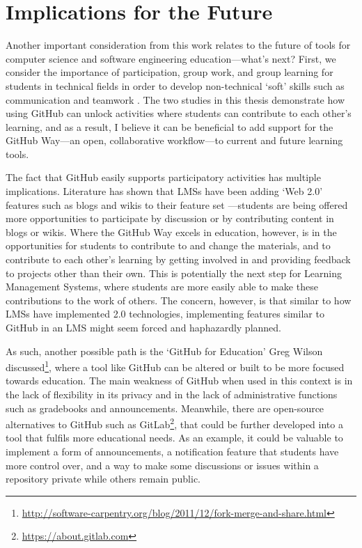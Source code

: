 \section{Implications for the Future}
Another important consideration from this work relates to the future of tools for computer science and software engineering education---what's next? First, we consider the importance of participation, group work, and group learning for students in technical fields in order to develop non-technical `soft' skills such as communication and teamwork \cite{jazayeri2004education}. The two studies in this thesis demonstrate how using GitHub can unlock activities where students can contribute to each other's learning, and as a result, I believe it can be beneficial to add support for the GitHub Way---an open, collaborative workflow---to current and future learning tools.

The fact that GitHub easily supports participatory activities has multiple implications. Literature has shown that LMSs have been adding `Web 2.0' features such as blogs and wikis to their feature set \cite{downes2005feature}---students are being offered more opportunities to participate by discussion or by contributing content in blogs or wikis. Where the GitHub Way excels in education, however, is in the opportunities for students to contribute to and change the materials, and to contribute to each other's learning by getting involved in and providing feedback to projects other than their own. This is potentially the next step for Learning Management Systems, where students are more easily able to make these contributions to the work of others. The concern, however, is that similar to how LMSs have implemented 2.0 technologies, implementing features similar to GitHub in an LMS might seem forced and haphazardly planned.

As such, another possible path is the `GitHub for Education' Greg Wilson discussed\footnote{\url{http://software-carpentry.org/blog/2011/12/fork-merge-and-share.html}}, where a tool like GitHub can be altered or built to be more focused towards education. The main weakness of GitHub when used in this context is in the lack of flexibility in its privacy and in the lack of administrative functions such as gradebooks and announcements. Meanwhile, there are open-source alternatives to GitHub such as GitLab\footnote{\url{https://about.gitlab.com}}, that could be further developed into a tool that fulfils more educational needs. As an example, it could be valuable to implement a form of announcements, a notification feature that students have more control over, and a way to make some discussions or issues within a repository private while others remain public.


